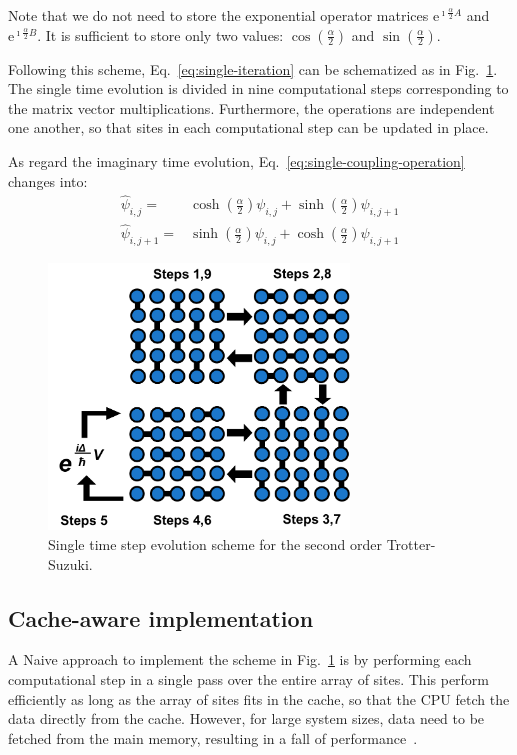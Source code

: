 Note that we do not need to store the exponential operator matrices $\mathrm{e}^{\imath \frac{\alpha}{2} A}$ and $\mathrm{e}^{\imath \frac{\alpha}{2} B}$. It is sufficient to store only two values: $ \cos\left(\frac{\alpha}{2}\right)$ and $\sin\left(\frac{\alpha}{2}\right)$.

Following this scheme, Eq.~\eqref{eq:single-iteration} can be schematized as in Fig.~\ref{fig:scheme-iteration}. The single time evolution is divided in nine computational steps corresponding to the matrix vector multiplications. Furthermore, the operations are independent one another, so that sites in each computational step can be updated in place.

As regard the imaginary time evolution, Eq.~\eqref{eq:single-coupling-operation} changes into:
\begin{align} \label{eq:single-coupling-operation-imag}
\hat{\psi}_{i,j} = & \cosh\left(\frac{\alpha}{2}\right) \psi_{i,j} + \sinh\left(\frac{\alpha}{2}\right) \psi_{i,j+1} \nonumber \\ 
\hat{\psi}_{i,j+1} = & \sinh\left(\frac{\alpha}{2}\right) \psi_{i,j} + \cosh\left(\frac{\alpha}{2}\right) \psi_{i,j+1} 
\end{align}
\begin{figure} 
   \centering
   \includegraphics[width=8cm]{Figs/Single_time_step_evolution.png}
   \caption{Single time step evolution scheme for the second order Trotter-Suzuki.} \label{fig:scheme-iteration}
\end{figure}

\subsection{Cache-aware implementation}
A Naive approach to implement the scheme in Fig.~\ref{fig:scheme-iteration} is by performing each computational step in a single pass over the entire array of sites. This perform efficiently as long as the array of sites fits in the cache, so that the CPU fetch the data directly from the cache. However, for large system sizes, data need to be fetched from the main memory, resulting in a fall of performance~\citep{bederian2011boosting}. 

